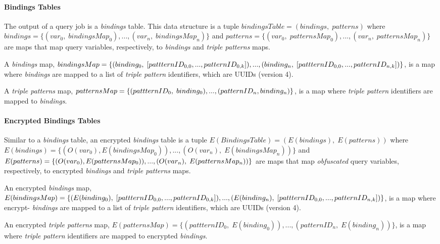 \paragraph{Bindings Tables} The output of a query job is a \emph{bindings} table. This data structure is a tuple $bindingsTable = (bindings, \; patterns)$ where $bindings = \{ (var_0, \; bindingsMap_0), ..., \allowbreak (var_n, \; bindingsMap_n)\}$ and $patterns = \{ (var_0, \; patternsMap_0), ...,  (var_n, \; patternsMap_n)\}$ are maps that map query variables, respectively, to \emph{bindings} and \emph{triple patterns} maps.

A \emph{bindings} map, $bindingsMap = \{ (binding_0, \; [pattternID_{0,0},...,patternID_{0,k}]),...,\linebreak(binding_n, \; [pattternID_{0,0},...,patternID_{n,k}])\}$, is a map where \emph{bindings} are mapped to a list of \emph{triple pattern} identifiers, which are \gls{UUID}s (version 4).

A \emph{triple patterns} map, $patternsMap = \{ (pattternID_0, \; binding_0),..., (patternID_n, \linebreak binding_n)\}$, is a map where \emph{triple pattern} identifiers are mapped to \emph{bindings}.


\paragraph{Encrypted Bindings Tables} Similar to a \emph{bindings} table, an encrypted \emph{bindings} table is a tuple $E(BindingsTable) = (E(bindings), \; E(patterns))$ where $E(bindings) = \{ (O(var_0), \allowbreak E(bindingsMap_0)), ..., (O(var_n), \; E(bindingsMap_n))\}$ and $E(patterns) = \{ (O(var_0), \linebreak E(patternsMap_0)), ..., (O(var_n), \; E(patternsMap_n))\}$ are maps that map \emph{obfuscated} query variables, respectively, to encrypted \emph{bindings} and \emph{triple patterns} maps.

An encrypted \emph{bindings} map, $E(bindingsMap) = \{ (E(binding_0), \; [pattternID_{0,0},...,\linebreak patternID_{0,k}]),..., (E(binding_n), \; [pattternID_{0,0},...,patternID_{n,k}])\}$, is a map where encrypt-\linebreak{}  \emph{bindings} are mapped to a list of \emph{triple pattern} identifiers, which are \gls{UUID}s (version 4).

An encrypted \emph{triple patterns} map, $E(patternsMap) = \{ (pattternID_0, \; E(binding_0)),..., \allowbreak (patternID_n, \; E(binding_n))\}$, is a map where \emph{triple pattern} identifiers are mapped to encrypted \emph{bindings}.

